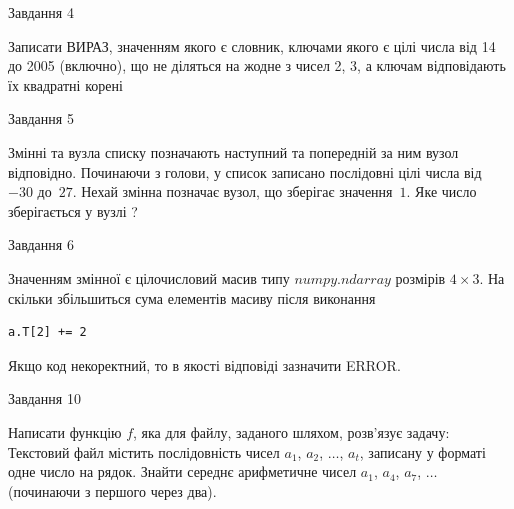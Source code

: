\documentclass[12pt, ukrainian]{article}
\begin{document}
{\begin{minipage}[t]{8.0cm}
\begin{verbatim}
\end{verbatim}            

\end{minipage}


               
{\begin{center}Завдання {4}\end{center}}
\vspace{-4mm}
Записати ВИРАЗ, значенням якого є словник, ключами якого є цілі числа від 14 до 2005 (включно), що не діляться на жодне з чисел 2, 3, а ключам відповідають їх квадратні корені\par

\vspace{10mm}
               
{\begin{center}Завдання {5}\end{center}}
\vspace{-4mm}
Змінні  та  вузла списку позначають наступний та попередній за ним вузол відповідно. Починаючи з голови, у список записано послідовні цілі числа від~$-30$ до~$27$. Нехай змінна  позначає вузол, що зберігає значення~$1$.
Яке число зберігається у вузлі  ?\par

               
{\begin{center}Завдання {6}\end{center}}
\vspace{-4mm}
Значенням змінної  є цілочисловий масив типу $numpy.ndarray$ розмірів $4{\times}3$. На скільки збільшиться сума елементів масиву  після виконання
\begin{verbatim}
a.T[2] += 2
\end{verbatim}


Якщо код некоректний, то в якості відповіді зазначити ERROR.\par

               
{\begin{center}Завдання {10}\end{center}}
\vspace{-4mm}

Написати функцію $f$, яка для файлу, заданого шляхом, розв’язує задачу:\\ Текстовий файл містить послідовність чисел $a_1$, $a_2$, $\ldots$, $a_t$, записану у форматі одне число на рядок. Знайти середнє арифметичне чисел $a_1$, $a_4$, $a_7$, $\ldots$ (починаючи з першого через два).

}
\end{document}
